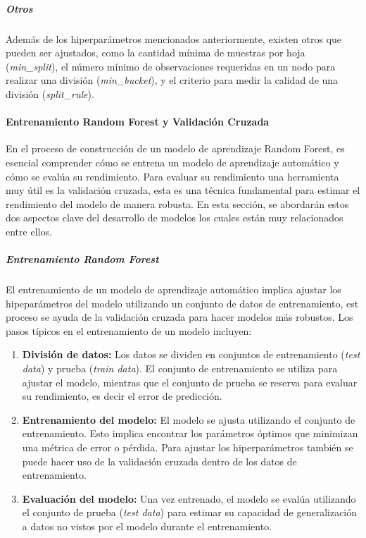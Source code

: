 \subparagraph{Otros}
Además de los hiperparámetros mencionados anteriormente, existen otros que pueden ser ajustados, como la cantidad mínima de muestras por hoja (\textit{min\_split}), el número mínimo de observaciones requeridas en un nodo para realizar una división (\textit{min\_bucket}), y el criterio para medir la calidad de una división (\textit{split\_rule}).

\paragraph{Entrenamiento Random Forest y Validación Cruzada}\label{sec:entrenamiento-rf-validacion-cruzada}

En el proceso de construcción de un modelo de aprendizaje Random Forest, es esencial comprender cómo se entrena un modelo de aprendizaje automático y cómo se evalúa su rendimiento. Para evaluar su rendimiento una herramienta muy útil es la validación cruzada, esta es una técnica fundamental para estimar el rendimiento del modelo de manera robusta. En esta sección, se abordarán estos dos aspectos clave del desarrollo de modelos los cuales están muy relacionados entre ellos.

\subparagraph{Entrenamiento Random Forest}

El entrenamiento de un modelo de aprendizaje automático implica ajustar los hipeparámetros del modelo utilizando un conjunto de datos de entrenamiento, est proceso se ayuda de la validación cruzada para hacer modelos más robustos. Los pasos típicos en el entrenamiento de un modelo incluyen:

\begin{enumerate}  
  \item \textbf{División de datos:} Los datos se dividen en conjuntos de entrenamiento (\textit{test data}) y prueba (\textit{train data}). El conjunto de entrenamiento se utiliza para ajustar el modelo, mientras que el conjunto de prueba se reserva para evaluar su rendimiento, es decir el error de predicción.
  
  \item \textbf{Entrenamiento del modelo:} El modelo se ajusta utilizando el conjunto de entrenamiento. Esto implica encontrar los parámetros óptimos que minimizan una métrica de error o pérdida. Para ajustar los hiperparámetros también se puede hacer uso de la validación cruzada dentro de los datos de entrenamiento.
  
  \item \textbf{Evaluación del modelo:} Una vez entrenado, el modelo se evalúa utilizando el conjunto de prueba (\textit{test data}) para estimar su capacidad de generalización a datos no vistos por el modelo durante el entrenamiento.
\end{enumerate}

